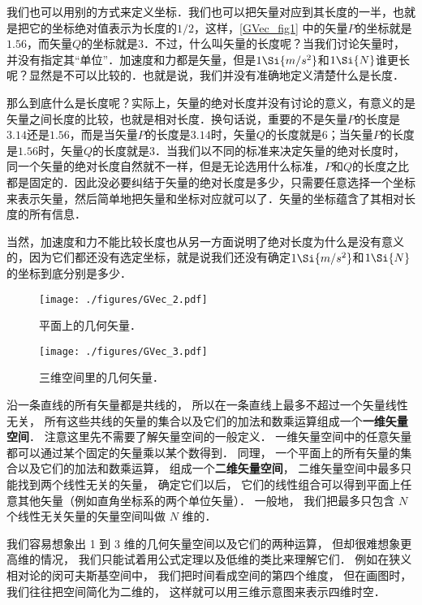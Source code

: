 我们也可以用别的方式来定义坐标．我们也可以把矢量对应到其长度的一半，也就是把它的坐标绝对值表示为长度的$1/2$，这样，\autoref{GVec_fig1} 中的矢量$P$的坐标就是$1.56$，而矢量$Q$的坐标就是$3$．不过，什么叫矢量的长度呢？当我们讨论矢量时，并没有指定其“单位”．加速度和力都是矢量，但是$1\Si{m/s^2}$和$1\Si{N}$谁更长呢？显然是不可以比较的．也就是说，我们并没有准确地定义清楚什么是长度．

那么到底什么是长度呢？实际上，矢量的绝对长度并没有讨论的意义，有意义的是矢量之间长度的比较，也就是相对长度．换句话说，重要的不是矢量$P$的长度是$3.14$还是$1.56$，而是当矢量$P$的长度是$3.14$时，矢量$Q$的长度就是$6$；当矢量$P$的长度是$1.56$时，矢量$Q$的长度就是$3$．当我们以不同的标准来决定矢量的绝对长度时，同一个矢量的绝对长度自然就不一样，但是无论选用什么标准，$P$和$Q$的长度之比都是固定的．因此没必要纠结于矢量的绝对长度是多少，只需要任意选择一个坐标来表示矢量，然后简单地把矢量和坐标对应就可以了．矢量的坐标蕴含了其相对长度的所有信息．

当然，加速度和力不能比较长度也从另一方面说明了绝对长度为什么是没有意义的，因为它们都还没有选定坐标，就是说我们还没有确定$1\Si{m/s^2}$和$1\Si{N}$的坐标到底分别是多少．

\begin{figure}[ht]
\centering
\texttt{[image: ./figures/GVec\_2.pdf]}
\caption{平面上的几何矢量．} \label{GVec_fig2}
\end{figure}

\begin{figure}[ht]
\centering
\texttt{[image: ./figures/GVec\_3.pdf]}
\caption{三维空间里的几何矢量．} \label{GVec_fig3}
\end{figure}










沿一条直线的所有矢量都是共线的， 所以在一条直线上最多不超过一个矢量线性无关， 所有这些共线的矢量的集合以及它们的加法和数乘运算组成一个\textbf{一维矢量空间}． 注意这里先不需要了解矢量空间的一般定义． 一维矢量空间中的任意矢量都可以通过某个固定的矢量乘以某个数得到． 同理， 一个平面上的所有矢量的集合以及它们的加法和数乘运算， 组成一个\textbf{二维矢量空间}， 二维矢量空间中最多只能找到两个线性无关的矢量， 确定它们以后， 它们的线性组合可以得到平面上任意其他矢量（例如直角坐标系的两个单位矢量）． 一般地， 我们把最多只包含 $N$ 个线性无关矢量的矢量空间叫做 $N$ 维的．

我们容易想象出 1 到 3 维的几何矢量空间以及它们的两种运算， 但却很难想象更高维的情况， 我们只能试着用公式定理以及低维的类比来理解它们． 例如在狭义相对论的闵可夫斯基空间中， 我们把时间看成空间的第四个维度， 但在画图时， 我们往往把空间简化为二维的， 这样就可以用三维示意图来表示四维时空．

